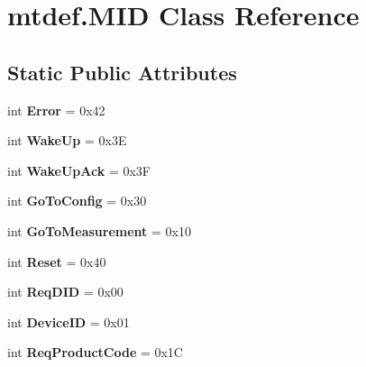 \hypertarget{classmtdef_1_1MID}{}\section{mtdef.\+M\+ID Class Reference}
\label{classmtdef_1_1MID}
\subsection*{Static Public Attributes}
\begin{DoxyCompactItemize}
\item 
\mbox{\label{classmtdef_1_1MID_a608e56ed598132190aaf01ba780dcab1}} 
int {\bfseries Error} = 0x42
\item 
\mbox{\label{classmtdef_1_1MID_ad104a29eb3990dae3a392a7cc5ba7c95}} 
int {\bfseries Wake\+Up} = 0x3E
\item 
\mbox{\label{classmtdef_1_1MID_a12491a02c68fb39dd1698a1bdcac8e0e}} 
int {\bfseries Wake\+Up\+Ack} = 0x3F
\item 
\mbox{\label{classmtdef_1_1MID_ad7b3e2db2289b8797835b03db4ac43f9}} 
int {\bfseries Go\+To\+Config} = 0x30
\item 
\mbox{\label{classmtdef_1_1MID_a04e17ffd654afb91678099f6199f3c37}} 
int {\bfseries Go\+To\+Measurement} = 0x10
\item 
\mbox{\label{classmtdef_1_1MID_ae9fd1db62b90f7837e1a15f8dd827d80}} 
int {\bfseries Reset} = 0x40
\item 
\mbox{\label{classmtdef_1_1MID_acffae763edc788f54a336718115c496e}} 
int {\bfseries Req\+D\+ID} = 0x00
\item 
\mbox{\label{classmtdef_1_1MID_a3f8fa7b6d3da3f699339804a7e2b071e}} 
int {\bfseries Device\+ID} = 0x01
\item 
\mbox{\label{classmtdef_1_1MID_a9ff2f0fa2cf5c3efbf710307b9ac782a}} 
int {\bfseries Req\+Product\+Code} = 0x1C
\item 
\mbox{\label{classmtdef_1_1MID_ac4ec4d43af4de52721a339f5fb91ebcf}} 

\end{DoxyCompactItemize}
